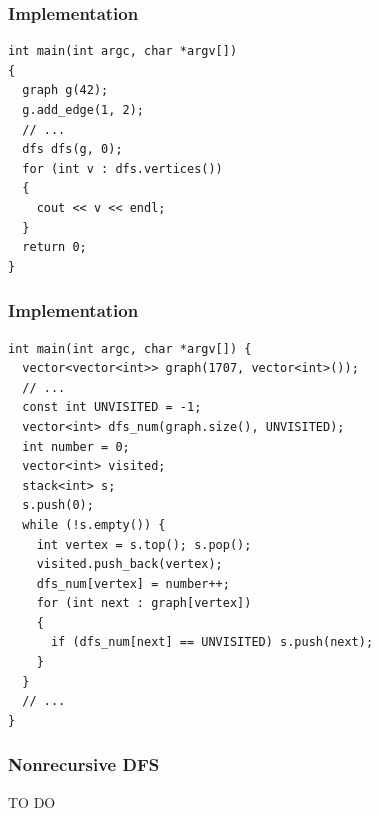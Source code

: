 \documentclass{beamer}
\newcounter{exo}
\newcommand{\exo}{
  \addtocounter{exo}{1}
  Exercice \arabic{exo}
}
\begin{document}
\begin{frame}[containsverbatim]
\frametitle{Implementation}
\scriptsize
\begin{lstlisting}
int main(int argc, char *argv[])
{
  graph g(42);
  g.add_edge(1, 2);
  // ...
  dfs dfs(g, 0);
  for (int v : dfs.vertices())
  {
    cout << v << endl;
  }
  return 0;
}
\end{lstlisting}

\end{frame}

\begin{frame}[containsverbatim]
\frametitle{Implementation}
\scriptsize
\begin{lstlisting}
int main(int argc, char *argv[]) {
  vector<vector<int>> graph(1707, vector<int>());
  // ...
  const int UNVISITED = -1;
  vector<int> dfs_num(graph.size(), UNVISITED);
  int number = 0;
  vector<int> visited;
  stack<int> s;
  s.push(0);
  while (!s.empty()) {
    int vertex = s.top(); s.pop();
    visited.push_back(vertex);
    dfs_num[vertex] = number++;
    for (int next : graph[vertex])
    {
      if (dfs_num[next] == UNVISITED) s.push(next);
    }
  }
  // ...
}
\end{lstlisting}

\end{frame}

\begin{frame}%
\frametitle{Nonrecursive DFS}
\scriptsize

TO DO

\end{frame}




\ifanswers
\end{document}
